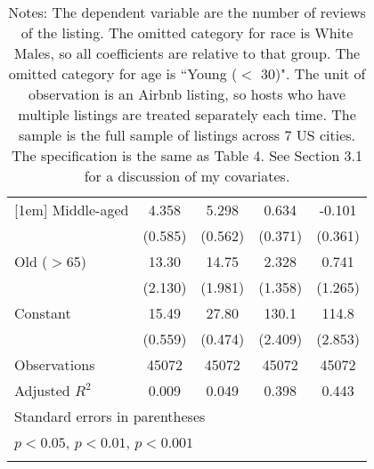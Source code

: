 {\begin{longtable}{l*{4}{c}}
[1em]
Middle-aged         &       4.358\sym{***}&       5.298\sym{***}&       0.634         &      -0.101         \\
                    &     (0.585)         &     (0.562)         &     (0.371)         &     (0.361)         \\
[1em]
Old ($>$65)           &       13.30\sym{***}&       14.75\sym{***}&       2.328         &       0.741         \\
                    &     (2.130)         &     (1.981)         &     (1.358)         &     (1.265)         \\
[1em]
Constant            &       15.49\sym{***}&       27.80\sym{***}&       130.1\sym{***}&       114.8\sym{***}\\
                    &     (0.559)         &     (0.474)         &     (2.409)         &     (2.853)         \\
\hline
Observations        &       45072         &       45072         &       45072         &       45072         \\
Adjusted \(R^{2}\)  &       0.009         &       0.049         &       0.398         &       0.443         \\
\hline\hline
\multicolumn{5}{l}{\footnotesize Standard errors in parentheses}\\
\multicolumn{5}{l}{\footnotesize \sym{*} \(p<0.05\), \sym{**} \(p<0.01\), \sym{***} \(p<0.001\)}\\
\caption*{Notes: The dependent variable are the number of reviews of the listing. The omitted category for race is White Males, so all coefficients are relative to that group. The omitted category for age is ``Young ($<$ 30)". The unit of observation is an Airbnb listing, so hosts who have multiple listings are treated separately each time. The sample is the full sample of listings across 7 US cities. The specification is the same as Table 4. See Section 3.1 for a discussion of my covariates.}
\end{longtable}
}

